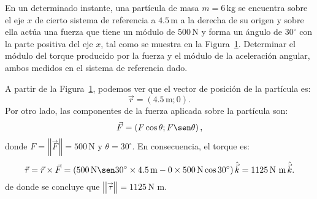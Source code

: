 \documentclass[addpoints]{exam}
\newcommand{\grado}[0]{^{\circ}}
\newcommand{\valmed}[1]{\left\langle #1 \right\rangle}
\newcommand{\norm}[1]{\left\vert\left\vert #1 \right\vert\right\vert}
\begin{document}
\begin{questions}
\begin{solution}
    \end{solution}

    \question En un determinado instante, una partícula de masa $m = 6 \, \text{kg} $ se encuentra sobre el eje $x$ de cierto sistema de referencia a $4.5 \, \text{m}$ a la derecha de su origen y sobre ella actúa una fuerza que tiene un módulo de $500 \, \text{N}$ y forma un ángulo de $30\grado$ con la parte positiva del eje $x$, tal como se muestra en la Figura~\ref{fig:torque}. Determinar el módulo del torque producido por la fuerza y el módulo de la aceleración angular, ambos medidos en el sistema de referencia dado.

    \begin{figure}[ht]
    \centering
    \caption{ }
    \label{fig:torque}
    \end{figure}

    \begin{solution}
    A partir de la Figura~\ref{fig:torque}, podemos ver que el vector de posición de la partícula es: $$\vec{r} = (4.5 \, \text{m} ; 0). $$ Por otro lado, las componentes de la fuerza aplicada sobre la partícula son: $$\vec{F} = \left(F \cos \theta; F \sen \theta \right),$$ donde $F = \norm{\vec{F}} = 500 \, \text{N}$ y $\theta = 30\grado$. En consecuencia, el torque es: $$ \vec{\tau} = \vec{r} \times \vec{F} = \left(500 \, \text{N} \sen 30\grado \times 4.5 \, \text{m} - 0 \times 500 \, \text{N} \cos 30\grado\right) \hat{\vec{k}} = 1125 \, \text{N m} \, \hat{\vec{k}}. $$ de donde se concluye que $\norm{\vec{\tau}} = 1125 \, \text{N m}$.


\end{solution}
\end{questions}
\end{document}
